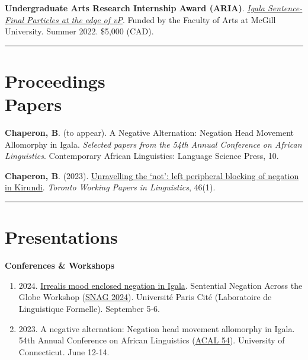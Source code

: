 \documentclass[margin,line]{resume}
\begin{document}
\begin{resume}
	{\textbf{Undergraduate Arts Research Internship Award (ARIA)}. \href{https://www.mcgill.ca/arts-internships/files/arts-internships/brandon_chaperon.pdf}{\textit{Igala Sentence-Final Particles at the edge of \textit{v}P}}. Funded by the Faculty of Arts at McGill University. %
	Summer 2022. \$5,000 (CAD).}

	\vspace{-0.7em}\rule{\textwidth}{0.4pt}



	\section{\mysidestyle Proceedings\\Papers}

	 {\textbf{Chaperon, B}. (to appear). A Negative Alternation: Negation Head Movement Allomorphy in Igala. \textit{Selected papers from the 54th Annual Conference on African Linguistics}. Contemporary African Linguistics: Language Science Press, 10.}

	 \newpage

	 {\textbf{Chaperon, B}. (2023). \href{https://twpl.library.utoronto.ca/index.php/twpl/article/view/39257}{Unravelling the `not': left peripheral blocking of negation in Kirundi}. \textit{Toronto Working Papers in Linguistics}, 46(1).}%

	\vspace{-0.9em}\rule{\textwidth}{0.4pt}


	\section{\mysidestyle Presentations}

	\textbf{Conferences \& Workshops}
	\begin{enumerate}[-, leftmargin=1em, topsep=0.5pt]
		
		\item[] {2024. \href{https://parissnag.com/conf/program/chaperon}{Irrealis mood enclosed negation in Igala}. Sentential Negation Across the Globe Workshop (\href{https://parissnag.com/conf}{SNAG 2024}). Université Paris Cité (Laboratoire de Linguistique Formelle). September 5-6.}
		
		\item[] {2023. A negative alternation: Negation head movement allomorphy in Igala. 54th Annual Conference on African Linguistics (\href{https://uconnuecs.cventevents.com/event/aef2d257-6a6a-41b5-b83d-2c6efc60aac5/summary}{ACAL 54}). University of Connecticut. June 12-14.}
		

\end{enumerate}
\end{resume}
\end{document}
